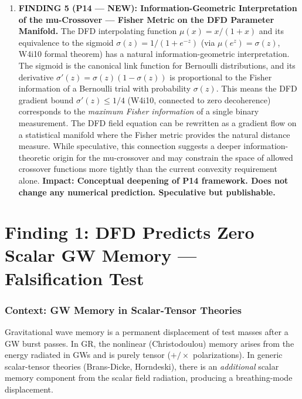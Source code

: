 \documentclass[11pt]{article}
\newcommand{\mufd}{\mu}
\begin{document}
\begin{tcolorbox}[colback=blue!5!white, colframe=blue!60!black,
  title=\textbf{W4i13 TOP 5 FINDINGS --- Ranked by Programme Impact}]
\begin{enumerate}
\item \textbf{FINDING 5 (P14 --- NEW): Information-Geometric Interpretation
  of the mu-Crossover --- Fisher Metric on the DFD Parameter Manifold.}
  The DFD interpolating function $\mufd(x) = x/(1+x)$ and its
  equivalence to the sigmoid $\sigma(z) = 1/(1+e^{-z})$ (via
  $\mufd(e^z) = \sigma(z)$, W4i10 formal theorem) has a natural
  information-geometric interpretation. The sigmoid is the canonical
  link function for Bernoulli distributions, and its derivative
  $\sigma'(z) = \sigma(z)(1-\sigma(z))$ is proportional to the
  Fisher information of a Bernoulli trial with probability $\sigma(z)$.
  This means the DFD gradient bound $\sigma'(z) \leq 1/4$ (W4i10,
  connected to zero decoherence) corresponds to the \emph{maximum
  Fisher information} of a single binary measurement. The DFD field
  equation can be rewritten as a gradient flow on a statistical
  manifold where the Fisher metric provides the natural distance
  measure. While speculative, this connection suggests a deeper
  information-theoretic origin for the mu-crossover and may
  constrain the space of allowed crossover functions more tightly
  than the current convexity requirement alone.
  \textbf{Impact: Conceptual deepening of P14 framework. Does not
  change any numerical prediction. Speculative but publishable.}

\end{enumerate}
\end{tcolorbox}


\part{Finding 1: DFD Predicts Zero Scalar GW Memory --- Falsification Test}
\label{part:memory}

\section{Context: GW Memory in Scalar-Tensor Theories}

Gravitational wave memory is a permanent displacement of test masses
after a GW burst passes. In GR, the nonlinear (Christodoulou) memory
arises from the energy radiated in GWs and is purely tensor ($+/\times$
polarizations). In generic scalar-tensor theories (Brans-Dicke,
Horndeski), there is an \emph{additional} scalar memory component from
the scalar field radiation, producing a breathing-mode displacement.
\end{document}
